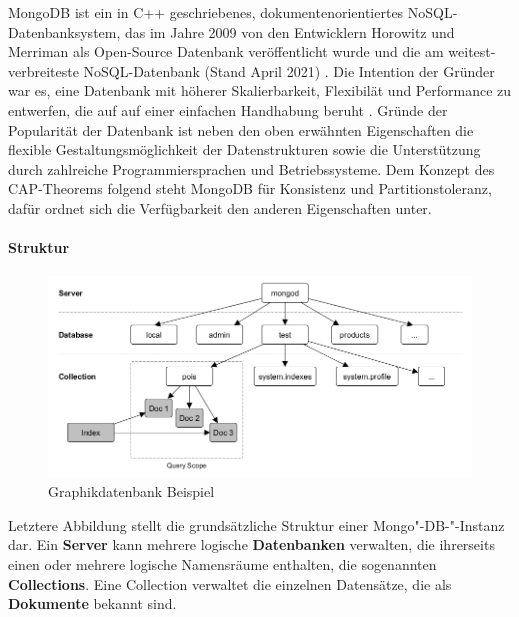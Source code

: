 MongoDB ist ein in C++ geschriebenes, dokumentenorientiertes NoSQL-Datenbanksystem, das im Jahre 2009 von den Entwicklern Horowitz und Merriman als Open-Source Datenbank veröffentlicht wurde und die am weitest-verbreiteste NoSQL-Datenbank (Stand April 2021) \cite{DB1.7}. Die Intention der Gründer war es, eine Datenbank mit höherer Skalierbarkeit, Flexibilät und Performance zu entwerfen, die auf auf einer einfachen Handhabung beruht \cite{DB1.65}.
Gründe der Popularität der Datenbank ist neben den oben erwähnten Eigenschaften die flexible Gestaltungsmöglichkeit der Datenstrukturen sowie die Unterstützung durch zahlreiche Programmiersprachen und Betriebssysteme.
\noindent
Dem Konzept des CAP-Theorems folgend steht MongoDB für Konsistenz und Partitionstoleranz, dafür ordnet sich die Verfügbarkeit den anderen Eigenschaften unter.
\newline

\paragraph{Struktur}

\begin{figure}[tbt]
\centering
\includegraphics[width=14cm]{images/MongoDB_Architektur.png}
\caption[Graphikdatenbank Beispiel]{Graphikdatenbank Beispiel \protect \footnotemark}
\end{figure}

\noindent
Letztere Abbildung stellt die grundsätzliche Struktur einer Mongo"-DB-"-Instanz dar.
Ein \textbf{Server} kann mehrere logische \textbf{Datenbanken} verwalten, die ihrerseits einen oder mehrere logische Namensräume enthalten, die sogenannten \textbf{Collections}. Eine Collection verwaltet die einzelnen Datensätze, die als \textbf{Dokumente} bekannt sind. 
\newline

